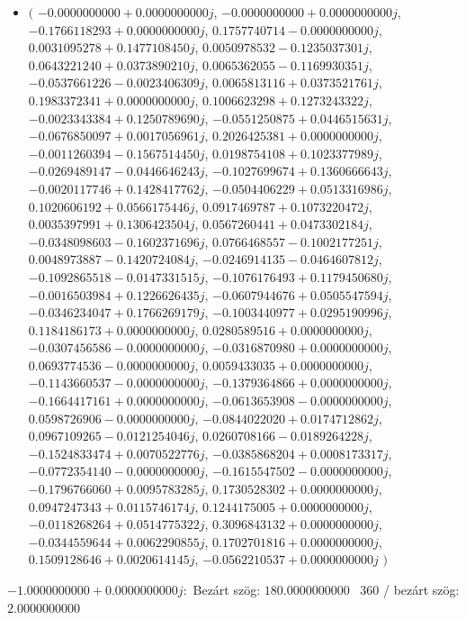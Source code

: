 \documentclass[14pt,a4paper]{article}
\begin{document}
\begin{itemize}
\item
$\big($
$-0.0000000000+0.0000000000j$, $-0.0000000000+0.0000000000j$, $-0.1766118293+0.0000000000j$, $0.1757740714-0.0000000000j$, $0.0031095278+0.1477108450j$, $0.0050978532-0.1235037301j$, $0.0643221240+0.0373890210j$, $0.0065362055-0.1169930351j$, $-0.0537661226-0.0023406309j$, $0.0065813116+0.0373521761j$, $0.1983372341+0.0000000000j$, $0.1006623298+0.1273243322j$, $-0.0023343384+0.1250789690j$, $-0.0551250875+0.0446515631j$, $-0.0676850097+0.0017056961j$, $0.2026425381+0.0000000000j$, $-0.0011260394-0.1567514450j$, $0.0198754108+0.1023377989j$, $-0.0269489147-0.0446646243j$, $-0.1027699674+0.1360666643j$, $-0.0020117746+0.1428417762j$, $-0.0504406229+0.0513316986j$, $0.1020606192+0.0566175446j$, $0.0917469787+0.1073220472j$, $0.0035397991+0.1306423504j$, $0.0567260441+0.0473302184j$, $-0.0348098603-0.1602371696j$, $0.0766468557-0.1002177251j$, $0.0048973887-0.1420724084j$, $-0.0246914135-0.0464607812j$, $-0.1092865518-0.0147331515j$, $-0.1076176493+0.1179450680j$, $-0.0016503984+0.1226626435j$, $-0.0607944676+0.0505547594j$, $-0.0346234047+0.1766269179j$, $-0.1003440977+0.0295190996j$, $0.1184186173+0.0000000000j$, $0.0280589516+0.0000000000j$, $-0.0307456586-0.0000000000j$, $-0.0316870980+0.0000000000j$, $0.0693774536-0.0000000000j$, $0.0059433035+0.0000000000j$, $-0.1143660537-0.0000000000j$, $-0.1379364866+0.0000000000j$, $-0.1664417161+0.0000000000j$, $-0.0613653908-0.0000000000j$, $0.0598726906-0.0000000000j$, $-0.0844022020+0.0174712862j$, $0.0967109265-0.0121254046j$, $0.0260708166-0.0189264228j$, $-0.1524833474+0.0070522776j$, $-0.0385868204+0.0008173317j$, $-0.0772354140-0.0000000000j$, $-0.1615547502-0.0000000000j$, $-0.1796766060+0.0095783285j$, $0.1730528302+0.0000000000j$, $0.0947247343+0.0115746174j$, $0.1244175005+0.0000000000j$, $-0.0118268264+0.0514775322j$, $0.3096843132+0.0000000000j$, $-0.0344559644+0.0062290855j$, $0.1702701816+0.0000000000j$, $0.1509128646+0.0020614145j$, $-0.0562210537+0.0000000000j$
$\big)$
\end{itemize}
$-1.0000000000+0.0000000000j$:\
Bezárt szög: $180.0000000000$ \
360 / bezárt szög: $2.0000000000$\
\end{document}
